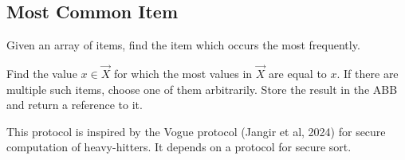 \subsection{Most Common Item}

Given an array of items, find the item which occurs the most frequently.

\begin{functionality}[MostCommonItem$({[\vec{X}]^B})$]
	Find the value $x \in \vec{X}$ for which the most values in $\vec{X}$
	are equal to $x$.
	If there are multiple such items, choose one of them arbitrarily.
	Store the result in the ABB and return a reference to it.
\end{functionality}

This protocol is inspired by the Vogue protocol (Jangir et al, 2024)
for secure computation of heavy-hitters. 
It depends on a protocol for secure sort.

